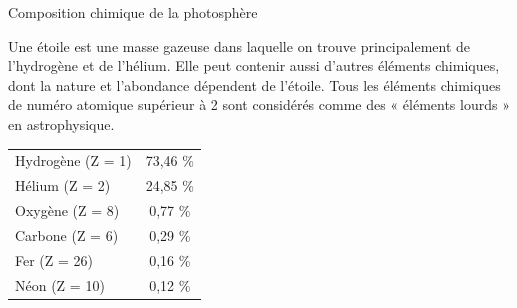 \documentclass[24pt]{article}
\begin{document}
\begin{documentpeda}{Composition chimique de la photosphère}

    \hspace{20pt}
    \begin{minipage}[c]{0.45\textwidth}
        Une étoile est une masse gazeuse dans laquelle on trouve principalement de l’hydrogène et de l’hélium.
        Elle peut contenir aussi d’autres éléments chimiques, dont la nature et l’abondance dépendent de l’étoile.
        Tous les éléments chimiques de numéro atomique supérieur à 2 sont considérés comme des
        « éléments lourds » en astrophysique.
    \end{minipage}
    \hspace{20pt}
    \begin{minipage}[c]{0.45\textwidth}
        \begin{center}
            \setlength{\tabcolsep}{18pt}
            \renewcommand{\arraystretch}{1.5}
            \begin{tabular}{@{}|l|c|@{}} \toprule
                Hydrogène (Z = 1) & 73,46 \% \\
                Hélium (Z = 2)    & 24,85 \% \\
                Oxygène (Z = 8)   & 0,77  \% \\
                Carbone (Z = 6)   & 0,29  \% \\
                Fer (Z = 26)      & 0,16  \% \\
                Néon (Z = 10)     & 0,12  \% \\
                \bottomrule
            \end{tabular}
        \end{center}
    \end{minipage}





\end{documentpeda}



\begin{question}
\end{question}
\end{document}
